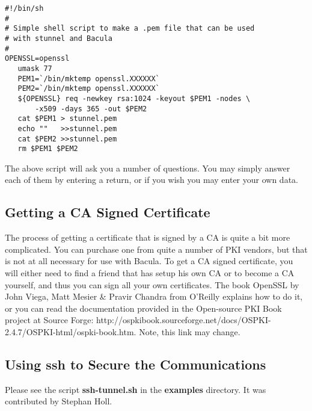 \footnotesize
\begin{verbatim}
#!/bin/sh
#
# Simple shell script to make a .pem file that can be used
# with stunnel and Bacula
#
OPENSSL=openssl
   umask 77
   PEM1=`/bin/mktemp openssl.XXXXXX`
   PEM2=`/bin/mktemp openssl.XXXXXX`
   ${OPENSSL} req -newkey rsa:1024 -keyout $PEM1 -nodes \
       -x509 -days 365 -out $PEM2
   cat $PEM1 > stunnel.pem
   echo ""   >>stunnel.pem
   cat $PEM2 >>stunnel.pem
   rm $PEM1 $PEM2
\end{verbatim}
\normalsize

The above script will ask you a number of questions. You may simply answer
each of them by entering a return, or if you wish you may enter your own data.


\subsection*{Getting a CA Signed Certificate}

The process of getting a certificate that is signed by a CA is quite a bit
more complicated. You can purchase one from quite a number of PKI vendors, but
that is not at all necessary for use with Bacula. To get a CA signed
certificate, you will either need to find a friend that has setup his own CA
or to become a CA yourself, and thus you can sign all your own certificates.
The book OpenSSL by John Viega, Matt Mesier \& Pravir Chandra from O'Reilly
explains how to do it, or you can read the documentation provided in the
Open-source PKI Book project at Source Forge: 
{http://ospkibook.sourceforge.net/docs/OSPKI-2.4.7/OSPKI-html/ospki-book.htm}.
Note, this link may change. 

\subsection*{Using ssh to Secure the Communications}

Please see the script {\bf ssh-tunnel.sh} in the {\bf examples} directory. It
was contributed by Stephan Holl. 
